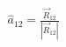 \documentclass[preview]{standalone}
\begin{document}
\begin{align*}
\hat{a}_{12} = \frac{\vec{R}_{12}}{|\vec{R}_{12}|}
\end{align*}
\end{document}
